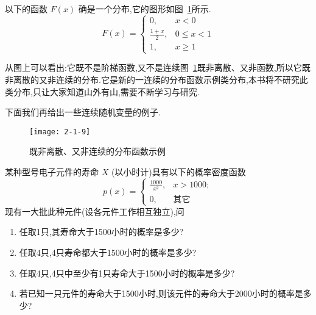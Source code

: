 \begin{example}\label{exam:2.1.9}
	以下的函数 $ F(x) $ 确是一个分布,它的图形如图~\ref{fig:2.1.9}所示.
	\[ 
	F(x)=\left\{\begin{array}{ll}{0,} & {x<0} \\ {\frac{1+x}{2},} & {0 \leqslant x<1} \\ {1,} & {x \geqslant 1}\end{array}\right.
	\]
	
	从图上可以看出:它既不是阶梯函数,又不是连续图~\ref{fig:2.1.9}既非离散、又非函数,所以它既非离散的又非连续的分布.它是新的一连续的分布函数示例类分布,本书将不研究此类分布,只让大家知道山外有山,需要不断学习与研究.
\end{example}

下面我们再给出一些连续随机变量的例子.

\begin{figure}
	\centering
	\texttt{[image: 2-1-9]}
	\caption{既非离散、又非连续的分布函数示例}
	\label{fig:2.1.9}
\end{figure}

\begin{example}\label{exam:2.1.10}
	某种型号电子元件的寿命 $ X $ (以小时计)具有以下的概率密度函数
	\[ 
	p(x)=\left\{\begin{array}{ll}
	\frac{1000}{x^{2}}, &x>1000;\\ 
	{0}, & \text{其它}
	\end{array}\right.
	\]
	现有一大批此种元件(设各元件工作相互独立),问
	
	\begin{enumerate}
		\item 任取1只,其寿命大于1500小时的概率是多少?
		\item 任取4只,4只寿命都大于1500小时的概率是多少?
		\item 任取4只,4只中至少有1只寿命大于1500小时的概率是多少?
		\item 若已知一只元件的寿命大于1500小时,则该元件的寿命大于2000小时的概率是多少?
	\end{enumerate}
\end{example}

